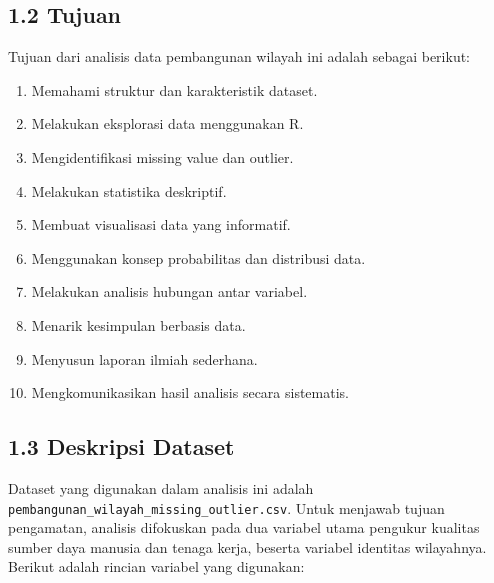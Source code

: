 \documentclass[
]{article}
\providecommand{\tightlist}{%
  \setlength{\itemsep}{0pt}\setlength{\parskip}{0pt}}
\begin{document}
\subsection{1.2 Tujuan}\label{tujuan}

Tujuan dari analisis data pembangunan wilayah ini adalah sebagai
berikut:

\begin{enumerate}
\def\labelenumi{\arabic{enumi}.}
\tightlist
\item
  Memahami struktur dan karakteristik dataset.
\item
  Melakukan eksplorasi data menggunakan R.
\item
  Mengidentifikasi missing value dan outlier.
\item
  Melakukan statistika deskriptif.
\item
  Membuat visualisasi data yang informatif.
\item
  Menggunakan konsep probabilitas dan distribusi data.
\item
  Melakukan analisis hubungan antar variabel.
\item
  Menarik kesimpulan berbasis data.
\item
  Menyusun laporan ilmiah sederhana.
\item
  Mengkomunikasikan hasil analisis secara sistematis.
\end{enumerate}

\subsection{1.3 Deskripsi Dataset}\label{deskripsi-dataset}

Dataset yang digunakan dalam analisis ini adalah
\texttt{pembangunan\_wilayah\_missing\_outlier.csv}. Untuk menjawab
tujuan pengamatan, analisis difokuskan pada dua variabel utama pengukur
kualitas sumber daya manusia dan tenaga kerja, beserta variabel
identitas wilayahnya. Berikut adalah rincian variabel yang digunakan:
\end{document}
